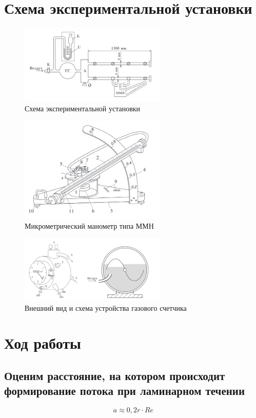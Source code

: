 \documentclass[a4paper]{article}
\begin{document}
	\section{Схема экспериментальной установки}
	\begin{figure}[h!]
		\centering
		\includegraphics[width=70mm]{pic1.png}
		\caption{Схема экспериментальной установки \label{overflow}}
	\end{figure}
	\begin{figure}[h!]
		\centering
		\includegraphics[width=70mm]{pic2.png}
		\caption{Микрометрический манометр типа ММН \label{overflow}}
	\end{figure}
	\begin{figure}[h!]
		\centering
		\includegraphics[width=70mm]{pic3.png}
		\caption{Внешний вид и схема устройства газового счетчика \label{overflow}}
	\end{figure}
	\newpage
	\section{Ход работы}
	\subsection{Оценим расстояние, на котором происходит формирование потока при ламинарном течении}
	\begin{equation}
		a\approx0,2r\cdot Re
	\end{equation}
\end{document}
